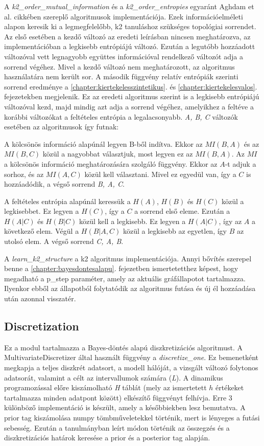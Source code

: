 A \emph{k2\_order\_mutual\_information} és a \emph{k2\_order\_entropies} egyaránt Aghdam et al. \cite{aghdam2019some} cikkében szereplő algoritmusok implementációja. Ezek információelméleti alapon keresik ki a legmegfelelőbb, k2 tanuláshoz szükséges topológiai sorrendet. Az első esetében a kezdő változó az eredeti leírásban nincsen meghatározva, az implementációban a legkisebb entrópiájú változó. Ezután a legutóbb hozzáadott változóval vett legnagyobb együttes információval rendelkező változót adja a sorrend végéhez. Mivel a kezdő változó nem meghatározott, az algoritmus használatára nem került sor. A második függvény relatív entrópiák szerinti sorrend eredménye a \ref{chapter:kiertekelesszintetikus}. és \ref{chapter:kiertekelesvalos}. fejezetekben megjelenik. Ez az eredeti algoritmus szerint is a legkisebb entrópiájú változóval kezd, majd mindig azt adja a sorrend végéhez, amelyikhez a feltéve a korábbi változókat a feltételes entrópia a legalacsonyabb. \emph{A, B, C} változók esetében az algoritmusok így futnak:

A kölcsönös információ alapúnál legyen B-ből indítva. Ekkor az $MI(B, A)$ és az $MI(B, C)$ közül a nagyobbat választjuk, most legyen ez az $MI(B, A)$. Az $MI$ a kölcsönös információ meghatározására szolgáló függvény. Ekkor az $A$-t adjuk a sorhoz, és az $MI(A, C)$ közül kell választani. Mivel ez egyedül van, így a $C$ is hozzáadódik, a végső sorrend \emph{B, A, C}.

A feltételes entrópia alapúnál keressük a $H(A)$, $H(B)$ és $H(C)$ közül a legkisebbet. Ez legyen a $H(C)$, így a $C$ a sorrend első eleme. Ezután a $H(A|C)$ és $H(B|C)$ közül kell a legkisebb. Ez legyen a $H(A|C)$, így az $A$ a következő elem. Végül a $H(B|A,C)$ közül a legkisebb az egyetlen, így $B$ az utolsó elem. A végső sorrend \emph{C, A, B}.

A \emph{learn\_k2\_structure} a k2 algoritmus implementációja. Annyi bővítés szerepel benne a \ref{chapter:bayesdontesalapu}. fejezetben ismertetetthez képest, hogy megadható a p\_step paraméter, amely az aktuális gráfállapotot tartalmazza. Ilyenkor ebből az állapotból folytatódik az algoritmus futása és új él hozzáadása után azonnal visszatér.

\subsection{Discretization}
Ez a modul tartalmazza a Bayes-döntés alapú diszkretizációs algoritmust. A MultivariateDiscretizer által használt függvény a \emph{discretize\_one}. Ez bemenetként megkapja a teljes diszkrét adatsort, a modell hálóját, a vizsgált változó folytonos adatsorát, valamint a célt az intervallumok számára (\emph{L}). A dinamikus programozással előre kiszámolható \emph{H} táblát (mely az ismertetett $h$ értékeket tartalmazza minden adatpont között) elkészítő függvényt felhívja. Erre 3 különböző implementáció is készült, amely a későbbiekben lesz bemutatva. A prior tag kiszámolása numpy tömbműveletekkel történik, mert is lényeges a futási sebesség. Ezután a tanulmányban leírt módon történik az összegzés és a diszkretizációs határok keresése a prior és a posterior tag alapján.

